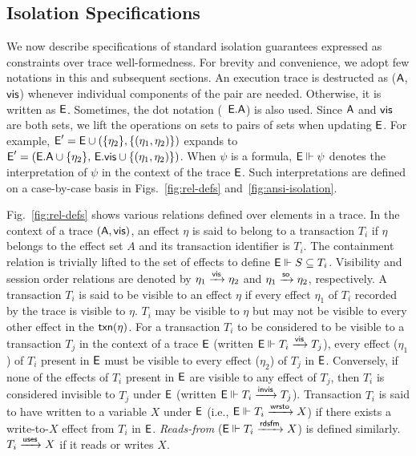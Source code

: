 \subsection{Isolation Specifications}
\label{sec:ansi-isolation}




We now describe specifications of standard isolation guarantees
expressed as constraints over trace well-formedness. For brevity and
convenience, we adopt few notations in this and subsequent sections.
An execution trace is destructed as ($\textsf{A}$,$\textsf{vis}$) whenever individual
components of the pair are needed. Otherwise, it is written as $\textsf{E}$.
Sometimes, the dot notation (\eg~$\textsf{E}.\textsf{A}$) is also used. Since $\textsf{A}$ and
$\textsf{vis}$ are both sets, we lift the operations on sets to pairs of sets
when updating $\textsf{E}$. For example, $\textsf{E}' = \textsf{E} \cup
(\{\eta_2\},\{(\eta_1,\eta_2)\})$ expands to $\textsf{E}' = (\textsf{E}.\textsf{A} \cup
\{\eta_2\},\,\textsf{E}.\textsf{vis} \cup \{(\eta_1,\eta_2)\})$.  When $\psi$ is a
formula, $\textsf{E} \Vdash \psi$ denotes the interpretation of $\psi$ in the
context of the trace $\textsf{E}$. Such interpretations are defined on a
case-by-case basis in Figs.~\ref{fig:rel-defs}
and~\ref{fig:ansi-isolation}. 

Fig.~\ref{fig:rel-defs} shows various relations defined over elements
in a trace. In the context of a trace $(\textsf{A},\textsf{vis})$, an effect $\eta$
is said to belong to a transaction $T_i$ if $\eta$ belongs to the
effect set $A$ and its transaction identifier is $T_i$. The
containment relation is trivially lifted to the set of effects to
define $\textsf{E} \Vdash S \subseteq T_i$.  Visibility and session order
relations are denoted by $\eta_1 \xrightarrow{\textsf{vis}} \eta_2$ and $\eta_1 \xrightarrow{\textsf{so}}
\eta_2$, respectively. A transaction $T_i$ is said to be visible to an
effect $\eta$ if every effect $\eta_1$ of $T_i$ recorded by the trace
is visible to $\eta$.  $T_i$ may be visible to $\eta$ but may not be
visible to every other effect in the $\textsf{txn}(\eta)$. For a transaction
$T_i$ to be considered to be visible to a transaction $T_j$ in the
context of a trace $\textsf{E}$ (written $\textsf{E} \Vdash T_i \xrightarrow{\textsf{vis}} T_j$), every
effect ($\eta_1$) of $T_i$ present in $\textsf{E}$ must be visible to every
effect ($\eta_2$) of $T_j$ in $\textsf{E}$.  Conversely, if none of the
effects of $T_i$ present in $\textsf{E}$ are visible to any effect of $T_j$,
then $T_i$ is considered invisible to $T_j$ under $\textsf{E}$ (written
$\textsf{E} \Vdash T_i \xrightarrow{\textsf{invis}} T_j$). Transaction $T_i$ is said to have
written to a variable $X$ under $\textsf{E}$ (i.e., $\textsf{E} \Vdash T_i \xrightarrow{\textsf{wrsto}} X$)
if there exists a write-to-$X$ effect from $T_i$ in $\textsf{E}$.
\emph{Reads-from} ($\textsf{E} \Vdash T_i \xrightarrow{\textsf{rdsfm}} X$) is defined similarly.
$T_i \xrightarrow{\textsf{uses}} X$ if it reads or writes $X$.


